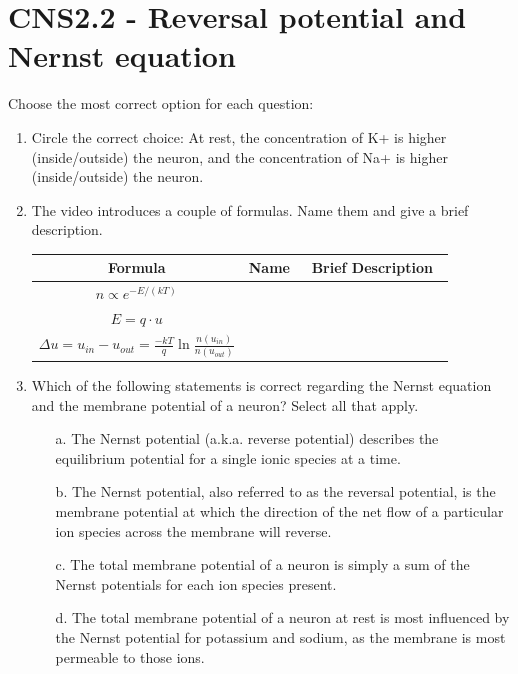\documentclass[11pt,letterpaper]{article}
\begin{document}
\maketitle
\thispagestyle{first}

\section{CNS2.2 - Reversal potential and Nernst equation}
Choose the most correct option for each question:
\begin{enumerate}
    \item Circle the correct choice: At rest, the concentration of K+ is higher (inside/outside) the neuron, and the concentration of Na+ is higher (inside/outside) the neuron.

    \item The video introduces a couple of formulas. Name them and give a brief description.
    \begin{table}[h]
        \centering
        \begin{tabular}{c|c|c}
        \hline
         Formula & \hspace{1 cm} Name \hspace{1 cm} & \hspace{2 cm}\, Brief Description \hspace{2 cm} \,\\
        \hline
        \hline
        $n \propto e^{-E/(kT)}$ &  & \\
        $E = q \cdot u$ & & \\
        $\Delta u = u_{in} - u_{out} = \frac{-kT}{q}\ln\frac{n(u_{in})}{n(u_{out})}$ & & \\
        \hline
        \end{tabular}
    \end{table}

    \item Which of the following statements is correct regarding the Nernst equation and the membrane potential of a neuron? Select all that apply.
    \begin{enumerate}
        \item [a.] The Nernst potential (a.k.a. reverse potential) describes the equilibrium potential for a single ionic species at a time.
        \item [b.] The Nernst potential, also referred to as the reversal potential, is the membrane potential at which the direction of the net flow of a particular ion species across the membrane will reverse.
        \item [c.] The total membrane potential of a neuron is simply a sum of the Nernst potentials for each ion species present.
        \item [d.] The total membrane potential of a neuron at rest is most influenced by the Nernst potential for potassium and sodium, as the membrane is most permeable to those ions.
    \end{enumerate}
\end{enumerate}
\end{document}
